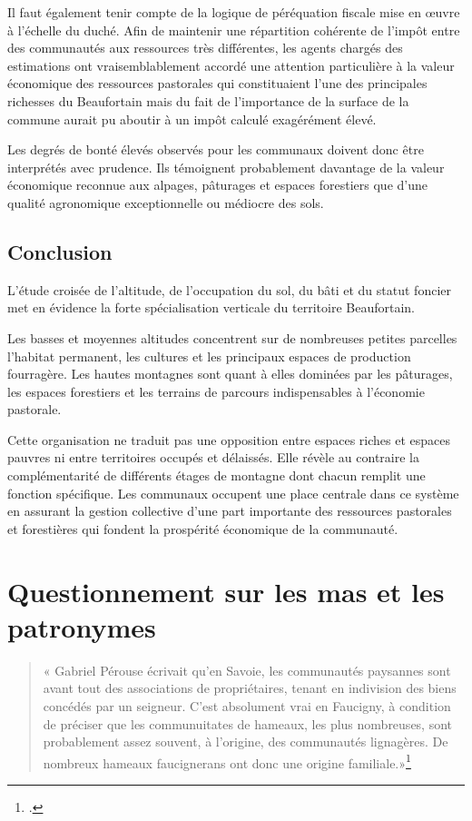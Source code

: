 \documentclass[12pt,a4paper]{report}
\begin{document}
	Il faut également tenir compte de la logique de péréquation fiscale mise en œuvre à l'échelle du duché. Afin de maintenir une répartition cohérente de l'impôt entre des communautés aux ressources très différentes, les agents chargés des estimations ont vraisemblablement accordé une attention particulière à la valeur économique des ressources pastorales qui constituaient l'une des principales richesses du Beaufortain mais du fait de l'importance de la surface de la commune aurait pu aboutir à un impôt calculé exagérément élevé.
	
	Les degrés de bonté élevés observés pour les communaux doivent donc être interprétés avec prudence. Ils témoignent probablement davantage de la valeur économique reconnue aux alpages, pâturages et espaces forestiers que d'une qualité agronomique exceptionnelle ou médiocre des sols.
	
\subsection{Conclusion}
	
	L'étude croisée de l'altitude, de l'occupation du sol, du bâti et du statut foncier met en évidence la forte spécialisation verticale du territoire Beaufortain.
	
	Les basses et moyennes altitudes concentrent sur de nombreuses petites parcelles l'habitat permanent, les cultures et les principaux espaces de production fourragère. Les hautes montagnes sont quant à elles dominées par les pâturages, les espaces forestiers et les terrains de parcours indispensables à l'économie pastorale.
	
	Cette organisation ne traduit pas une opposition entre espaces riches et espaces pauvres ni entre territoires occupés et délaissés. Elle révèle au contraire la complémentarité de différents étages de montagne dont chacun remplit une fonction spécifique. Les communaux occupent une place centrale dans ce système en assurant la gestion collective d'une part importante des ressources pastorales et forestières qui fondent la prospérité économique de la communauté.
	
	


\section{Questionnement sur les mas et les patronymes}

	\begin{quote}
	« Gabriel Pérouse écrivait qu’en Savoie, les communautés paysannes sont avant tout des associations de propriétaires, tenant en indivision des biens concédés par un seigneur. C’est absolument vrai en Faucigny, à condition de préciser que les communuitates de hameaux, les plus nombreuses, sont probablement assez souvent, à l’origine, des communautés lignagères. De nombreux hameaux faucignerans ont donc une origine familiale.»\footcite[248]{Carrier2001VieMontagnardeFaucigny}
\end{quote}
\end{document}
